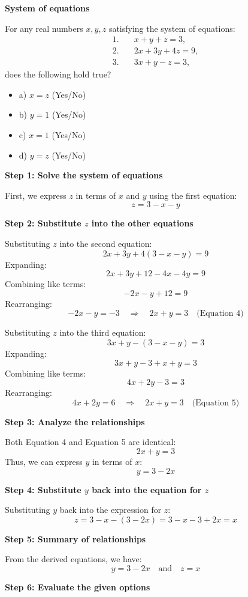 \documentclass{article}
\begin{document}
\textbf{System of equations}

For any real numbers \( x, y, z \) satisfying the system of equations:
\[
\begin{aligned}
1. & \quad x + y + z = 3, \\
2. & \quad 2x + 3y + 4z = 9, \\
3. & \quad 3x + y - z = 3,
\end{aligned}
\]
does the following hold true?
\begin{itemize}
    \item a) \( x = z \) (Yes/No)
    \item b) \( y = 1 \) (Yes/No)
    \item c) \( x = 1 \) (Yes/No)
    \item d) \( y = z \) (Yes/No)
\end{itemize}

\textbf{Step 1: Solve the system of equations}

First, we express \( z \) in terms of \( x \) and \( y \) using the first equation:
\[
z = 3 - x - y
\]

\textbf{Step 2: Substitute \( z \) into the other equations}

Substituting \( z \) into the second equation:
\[
2x + 3y + 4(3 - x - y) = 9
\]
Expanding:
\[
2x + 3y + 12 - 4x - 4y = 9
\]
Combining like terms:
\[
-2x - y + 12 = 9
\]
Rearranging:
\[
-2x - y = -3 \quad \Rightarrow \quad 2x + y = 3 \quad \text{(Equation 4)}
\]

Substituting \( z \) into the third equation:
\[
3x + y - (3 - x - y) = 3
\]
Expanding:
\[
3x + y - 3 + x + y = 3
\]
Combining like terms:
\[
4x + 2y - 3 = 3
\]
Rearranging:
\[
4x + 2y = 6 \quad \Rightarrow \quad 2x + y = 3 \quad \text{(Equation 5)}
\]

\textbf{Step 3: Analyze the relationships}

Both Equation 4 and Equation 5 are identical:
\[
2x + y = 3
\]
Thus, we can express \( y \) in terms of \( x \):
\[
y = 3 - 2x
\]

\textbf{Step 4: Substitute \( y \) back into the equation for \( z \)}

Substituting \( y \) back into the expression for \( z \):
\[
z = 3 - x - (3 - 2x) = 3 - x - 3 + 2x = x
\]

\textbf{Step 5: Summary of relationships}

From the derived equations, we have:
\[
y = 3 - 2x \quad \text{and} \quad z = x
\]

\textbf{Step 6: Evaluate the given options}
\end{document}
